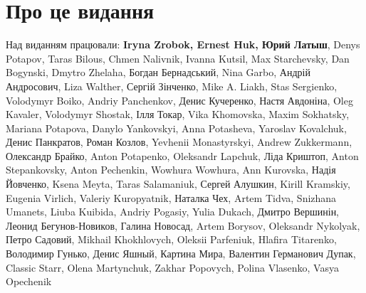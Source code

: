 \section{Про це видання}

Над виданням працювали:
\textbf{Iryna Zrobok, Ernest Huk, Юрий Латыш},
Denys Potapov, Taras Bilous, Chmen Nalivnik, Ivanna Kutsil, Max Starchevsky, Dan Bogynski, Dmytro Zhelaha, Богдан Бернадський, Nina Garbo, Андрій Андросович, Liza Walther, Сергій Зінченко,
Mike A. Liakh, Stas Sergienko, Volodymyr Boiko, Andriy Panchenkov, Денис Кучеренко, Настя Авдоніна, Oleg Kavaler, Volodymyr Shostak, Ілля Токар, Vika Khomovska, Maxim Sokhatsky, Mariana Potapova, Danylo Yankovskyi, Anna Potasheva, Yaroslav Kovalchuk, Денис Панкратов, Роман Козлов, Yevhenii Monastyrskyi, Andrew Zukkermann, Олександр Брайко, Anton Potapenko, Oleksandr Lapchuk, Ліда Криштоп, Anton Stepankovsky, Anton Pechenkin, Wowhura Wowhura, Ann Kurovska, Надія Йовченко, Ksena Meyta, Taras Salamaniuk, Сергей Алушкин, Kirill Kramskiy, Eugenia Virlich, Valeriy Kuropyatnik, Наталка Чех, Artem Tidva, Snizhana Umanets, Liuba Kuibida, Andriy Pogasiy, Yulia Dukach, Дмитро Вершинін, Леонид Бегунов-Новиков, Галина Новосад, Artem Borysov, Oleksandr Nykolyak, Петро Садовий, Mikhail Khokhlovych, Oleksii Parfeniuk, Hlafira Titarenko, Володимир Гунько, Денис Яшный, Картина Мира, Валентин Германович Дупак, Classic Starr, Olena Martynchuk, Zakhar Popovych, Polina Vlasenko, Vasya Opechenik

\cleardoublepage